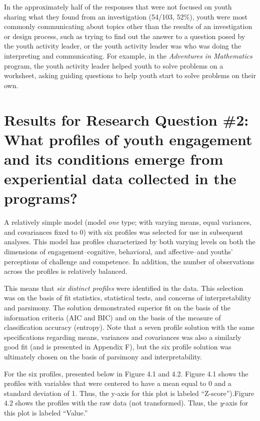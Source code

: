 \documentclass[]{book}
\theoremstyle{definition}
\theoremstyle{definition}
\theoremstyle{definition}
\theoremstyle{remark}
\begin{document}
In the approximately half of the responses that were not focused on
youth sharing what they found from an investigation (54/103, 52\%),
youth were most commonly communicating about topics other than the
results of an investigation or design process, such as trying to find
out the answer to a question posed by the youth activity leader, or the
youth activity leader was who was doing the interpreting and
communicating. For example, in the \emph{Adventures in Mathematics}
program, the youth activity leader helped youth to solve problems on a
worksheet, asking guiding questions to help youth start to solve
problems on their own.

\section{Results for Research Question \#2: What profiles of youth
engagement and its conditions emerge from experiential data collected in
the
programs?}\label{results-for-research-question-2-what-profiles-of-youth-engagement-and-its-conditions-emerge-from-experiential-data-collected-in-the-programs}

A relatively simple model (model \emph{one} type; with varying means,
equal variances, and covariances fixed to 0) with six profiles was
selected for use in subsequent analyses. This model has profiles
characterized by both varying levels on both the dimensions of
engagement--cognitive, behavioral, and affective--and youths'
perceptions of challenge and competence. In addition, the number of
observations across the profiles is relatively balanced.

This means that \emph{six distinct profiles} were identified in the
data. This selection was on the basis of fit statistics, statistical
tests, and concerns of interpretability and parsimony. The solution
demonstrated superior fit on the basis of the information criteria (AIC
and BIC) and on the basis of the measure of classification accuracy
(entropy). Note that a seven profile solution with the same
specifications regarding means, variances and covariances was also a
similarly good fit (and is presented in Appendix F), but the six profile
solution was ultimately chosen on the basis of parsimony and
interpretability.

For the six profiles, presented below in Figure 4.1 and 4.2. Figure 4.1
shows the profiles with variables that were centered to have a mean
equal to 0 and a standard deviation of 1. Thus, the y-axis for this plot
is labeled ``Z-score'').Figure 4.2 shows the profiles with the raw data
(not transformed). Thus, the \emph{y}-axis for this plot is labeled
``Value.''
\end{document}
